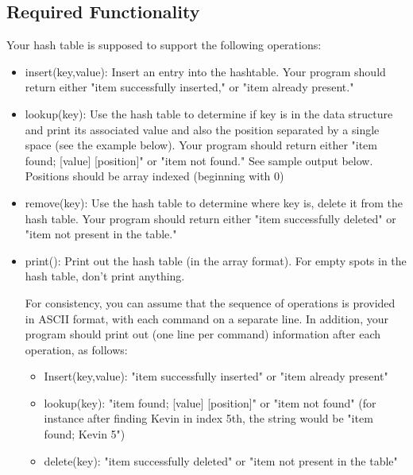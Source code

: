 \documentclass[times, 12pt]{article}
\begin{document}
\subsection*{Required Functionality}
Your hash table is supposed to support the following operations:\\
\begin{itemize}
    \item insert(key,value): Insert an entry into the hashtable. Your program should return either "item successfully inserted," or "item already present."\\
    
    \item lookup(key): Use the hash table to determine if key is in the data structure and print its associated value and also the position separated by a single space (see the example below).
    Your program should return either "item found; [value] [position]" or "item not found." See sample output below. Positions should be array indexed (beginning with 0)\\
    
    \item remove(key): Use the hash table to determine where key is, delete it from the hash table. Your program should return either "item successfully deleted" or "item not present in the table."\\
    
    \item print(): Print out the hash table (in the array format). For empty spots in the hash table, don't print anything.
    
    For consistency, you can assume that the sequence of operations is provided in ASCII format,
    with each command on a separate line. In addition, your program should print out (one line per
    command) information after each operation, as follows:
    
    \begin{itemize}
        \item Insert(key,value): "item successfully inserted" or "item already present"
        
        \item lookup(key): "item found; [value] [position]" or "item not found"
        (for instance after finding Kevin in index 5th, the string would be "item found; Kevin 5")
        
        \item delete(key): "item successfully deleted" or "item not present in the table"
        

\end{itemize}
\end{itemize}
\end{document}
